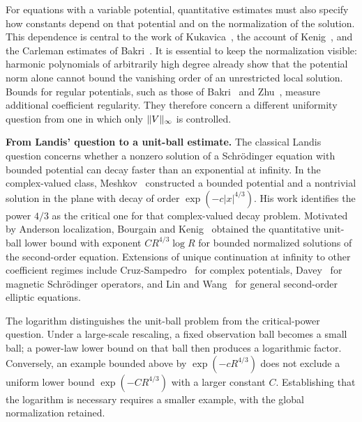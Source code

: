 \documentclass[11pt,a4paper,leqno]{amsart}
\numberwithin{equation}{section}
\theoremstyle{landisplain}
\theoremstyle{landisdefinition}
\theoremstyle{landisremark}
\DeclarePairedDelimiter{\norm}{\lVert}{\rVert}
\begin{document}
For equations with a variable potential, quantitative estimates must
also specify how constants depend on that potential and on the
normalization of the solution. This dependence is central to the
work of Kukavica~\cite{Kukavica}, the account of
Kenig~\cite{Kenig}, and the Carleman estimates of
Bakri~\cite{Bakri13}. It is essential to keep the normalization
visible: harmonic polynomials of arbitrarily high degree already
show that the potential norm alone cannot bound the vanishing order
of an unrestricted local solution. Bounds for regular potentials,
such as those of Bakri~\cite{Bakri12} and Zhu~\cite{Zhu16},
measure additional coefficient regularity. They therefore concern
a different uniformity question from one in which only
$\norm V_\infty$ is controlled.

\smallskip\noindent\textbf{From Landis' question to a unit-ball estimate.}
The classical Landis question concerns whether a nonzero solution
of a Schr\"odinger equation with bounded potential can decay faster
than an exponential at infinity. In the complex-valued class,
Meshkov~\cite{Meshkov} constructed a bounded potential and a
nontrivial solution in the plane with decay of order
$\exp(-c|x|^{4/3})$. His work identifies the power $4/3$ as the
critical one for that complex-valued decay problem. Motivated by
Anderson localization, Bourgain and Kenig~\cite{BK} obtained the
quantitative unit-ball lower bound with exponent
$CR^{4/3}\log R$ for bounded normalized solutions of the
second-order equation. Extensions of unique continuation at
infinity to other coefficient regimes include
Cruz-Sampedro~\cite{CS} for complex potentials, Davey~\cite{Davey}
for magnetic Schr\"odinger operators, and Lin and Wang~\cite{LW}
for general second-order elliptic equations.

The logarithm distinguishes the unit-ball problem from the
critical-power question. Under a large-scale rescaling, a fixed
observation ball becomes a small ball; a power-law lower bound
on that ball then produces a logarithmic factor. Conversely, an
example bounded above by $\exp(-cR^{4/3})$ does not exclude a
uniform lower bound $\exp(-CR^{4/3})$ with a larger constant
$C$. Establishing that the logarithm is necessary requires a
smaller example, with the global normalization retained.
\end{document}
